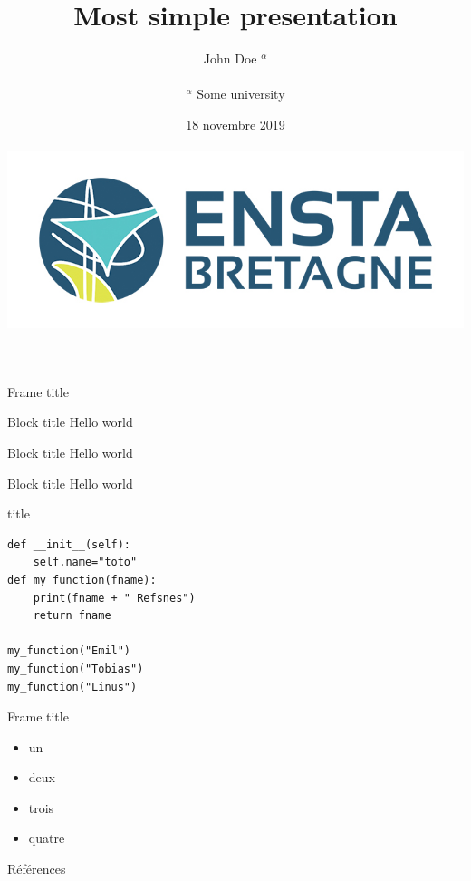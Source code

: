 \documentclass[aspectratio=169]{beamer}
\begin{document}
\title{Most simple presentation}
\author{John Doe $^{\alpha}$\\~\\
\small{$^{\alpha}$ Some university}} 
\date{18 novembre 2019\\~\\\includegraphics[width=.5\textwidth]{images/ensta-couleur}} 
\frame[plain]{\titlepage} 

\begin{frame}{Frame title}
\begin{exampleblock}{Block title}
Hello world
\end{exampleblock}
\begin{block}{Block title}
Hello world 
\end{block}
\begin{alertblock}{Block title}
Hello world \cite{Feynman1941}
\end{alertblock}
\end{frame}
\begin{frame}[fragile]{title}
\begin{lstlisting}[style=customc]
def __init__(self):
	self.name="toto"
def my_function(fname):
	print(fname + " Refsnes")
	return fname

my_function("Emil")
my_function("Tobias")
my_function("Linus") 
\end{lstlisting}
\end{frame}
\begin{frame}{Frame title}
	\begin{itemize}
		\item un
		\item deux
		\item trois
		\item quatre
	\end{itemize}
\end{frame}
\begin{frame}{Références}
\printbibliography
\end{frame}
\end{document}
